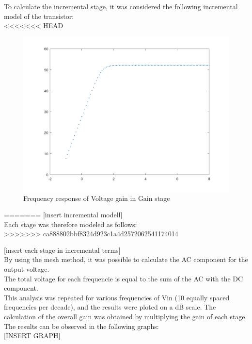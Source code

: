 To calculate the incremental stage, it was considered the following incremental model of the transistor:\\

<<<<<<< HEAD
\begin{figure} [!htb] 
  \includegraphics[width=\linewidth]{GAINVERDADEIRO.png}
  \caption{Frequency response of Voltage gain in Gain stage}
  \label{fig:theoplots}
  \endminipage\hfill
\end{figure}
=======
[insert incremental modell]\\

Each stage was therefore modeled as follows:\\
>>>>>>> ca888802bbf8324d923c1a4d2572062541174014

[insert each stage in incremental terms]\\

By using the mesh method, it was possible to calculate the AC component for the output voltage.\\
The total voltage for each frequencie is equal to the sum of the AC with the DC component.\\

This analysis was repeated for various frequencies of Vin (10 equally spaced frequencies per decade), and the results were ploted on a dB scale.
The calculation of the overall gain was obtained by multiplying the gain of each stage. The results can be observed in the following graphs:\\

[INSERT GRAPH]\\
